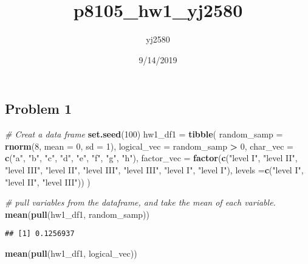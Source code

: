 \documentclass[]{article}
\title{p8105\_hw1\_yj2580}
\author{yj2580}
\date{9/14/2019}
\newenvironment{Shaded}{\begin{snugshade}}{\end{snugshade}}
\newcommand{\CommentTok}[1]{\textcolor[rgb]{0.56,0.35,0.01}{\textit{#1}}}
\newcommand{\DataTypeTok}[1]{\textcolor[rgb]{0.13,0.29,0.53}{#1}}
\newcommand{\DecValTok}[1]{\textcolor[rgb]{0.00,0.00,0.81}{#1}}
\newcommand{\KeywordTok}[1]{\textcolor[rgb]{0.13,0.29,0.53}{\textbf{#1}}}
\newcommand{\NormalTok}[1]{#1}
\newcommand{\OperatorTok}[1]{\textcolor[rgb]{0.81,0.36,0.00}{\textbf{#1}}}
\newcommand{\StringTok}[1]{\textcolor[rgb]{0.31,0.60,0.02}{#1}}
\begin{document}
\maketitle

\hypertarget{problem-1}{%
\subsection{Problem 1}\label{problem-1}}

\begin{Shaded}
\begin{Highlighting}[]
\CommentTok{# Creat a data frame}
\KeywordTok{set.seed}\NormalTok{(}\DecValTok{100}\NormalTok{)}
\NormalTok{hw1_df1 =}\StringTok{ }\KeywordTok{tibble}\NormalTok{(}
  \DataTypeTok{random_samp =} \KeywordTok{rnorm}\NormalTok{(}\DecValTok{8}\NormalTok{, }\DataTypeTok{mean =} \DecValTok{0}\NormalTok{, }\DataTypeTok{sd =} \DecValTok{1}\NormalTok{),}
  \DataTypeTok{logical_vec =}\NormalTok{ random_samp }\OperatorTok{>}\StringTok{ }\DecValTok{0}\NormalTok{,}
  \DataTypeTok{char_vec =} \KeywordTok{c}\NormalTok{(}\StringTok{"a"}\NormalTok{, }\StringTok{"b"}\NormalTok{, }\StringTok{"c"}\NormalTok{, }\StringTok{"d"}\NormalTok{, }\StringTok{"e"}\NormalTok{, }\StringTok{"f"}\NormalTok{, }\StringTok{"g"}\NormalTok{, }\StringTok{"h"}\NormalTok{),}
  \DataTypeTok{factor_vec =} \KeywordTok{factor}\NormalTok{(}\KeywordTok{c}\NormalTok{(}\StringTok{"level I"}\NormalTok{, }\StringTok{"level II"}\NormalTok{, }\StringTok{"level III"}\NormalTok{, }\StringTok{"level II"}\NormalTok{, }\StringTok{"level III"}\NormalTok{, }\StringTok{"level III"}\NormalTok{, }\StringTok{"level I"}\NormalTok{, }\StringTok{"level I"}\NormalTok{), }\DataTypeTok{levels =}\KeywordTok{c}\NormalTok{(}\StringTok{"level I"}\NormalTok{, }\StringTok{"level II"}\NormalTok{, }\StringTok{"level III"}\NormalTok{))}
\NormalTok{)}

\CommentTok{# pull variables from the dataframe, and take the mean of each variable.}
\KeywordTok{mean}\NormalTok{(}\KeywordTok{pull}\NormalTok{(hw1_df1, random_samp))}
\end{Highlighting}
\end{Shaded}

\begin{verbatim}
## [1] 0.1256937
\end{verbatim}

\begin{Shaded}
\begin{Highlighting}[]
\KeywordTok{mean}\NormalTok{(}\KeywordTok{pull}\NormalTok{(hw1_df1, logical_vec))}
\end{Highlighting}
\end{Shaded}
\end{document}
